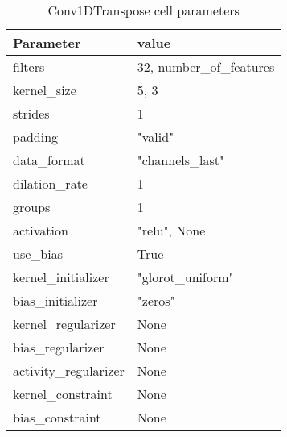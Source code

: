 \begin{table}[H]
  \centering
  \caption{Conv1DTranspose cell parameters}
  \label{table:conv1dtranspose-cell-parameters}
  \begin{tabular}{|l|l|}\hline
    Parameter             & value                    \\ \hline
    \hline
    filters               & 32, number\_of\_features \\ \hline
    kernel\_size          & 5, 3                     \\ \hline
    strides               & 1                        \\ \hline
    padding               & "valid"                  \\ \hline
    data\_format          & "channels\_last"         \\ \hline
    dilation\_rate        & 1                        \\ \hline
    groups                & 1                        \\ \hline
    activation            & "relu", None             \\ \hline
    use\_bias             & True                     \\ \hline
    kernel\_initializer   & "glorot\_uniform"        \\ \hline
    bias\_initializer     & "zeros"                  \\ \hline
    kernel\_regularizer   & None                     \\ \hline
    bias\_regularizer     & None                     \\ \hline
    activity\_regularizer & None                     \\ \hline
    kernel\_constraint    & None                     \\ \hline
    bias\_constraint      & None                     \\ \hline
    \hline
  \end{tabular}
\end{table}



